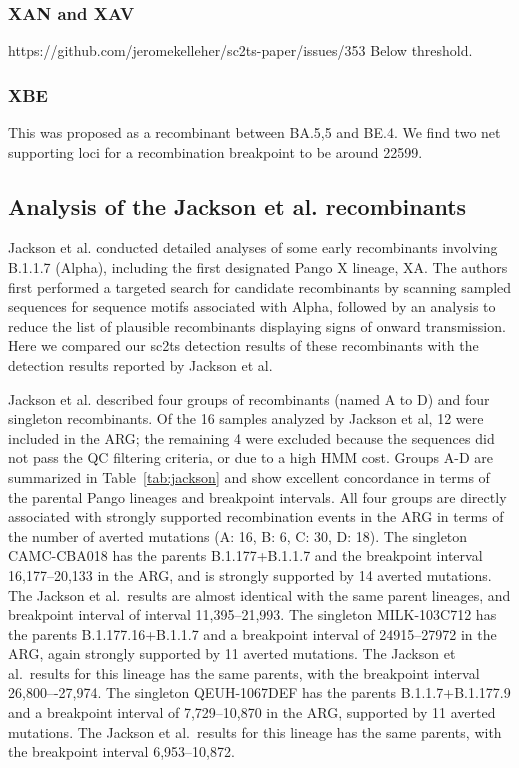 \documentclass[12pt,letterpaper]{article}
\begin{document}
\subsubsection*{XAN and XAV}
https://github.com/jeromekelleher/sc2ts-paper/issues/353
Below threshold.

\subsubsection*{XBE}
This was proposed as a recombinant between BA.5,5 and BE.4.
We find two net supporting loci for a recombination breakpoint to be around 22599.


\subsection*{Analysis of the Jackson et al. recombinants}
Jackson et al.\cite{Jackson2021} conducted detailed analyses of some early recombinants
involving B.1.1.7 (Alpha), including the first designated Pango X lineage, XA.
The authors first performed a targeted search for candidate recombinants by
scanning sampled sequences for sequence motifs associated with Alpha, followed
by an analysis to reduce the list of plausible recombinants displaying signs of
onward transmission. Here we compared our sc2ts detection results of these
recombinants with the detection results reported by Jackson et al.

Jackson et al. described four groups of recombinants (named A to D) and
four singleton recombinants.
Of the 16 samples analyzed by Jackson et al, 12 were included in the ARG;
the remaining 4 were excluded because the sequences did not pass the 
QC filtering criteria, or due to a high HMM cost. Groups A-D are summarized 
in Table~\ref{tab:jackson} and show excellent concordance in terms 
of the parental Pango lineages and breakpoint intervals. All four groups
are directly associated with strongly supported recombination events 
in the ARG in terms of the number of averted mutations 
(A: 16, B: 6, C: 30, D: 18).
The singleton CAMC-CBA018 has 
the parents B.1.177+B.1.1.7 and the breakpoint interval 16,177--20,133 in the ARG, 
and is strongly supported by 14 averted mutations.
The Jackson et al.\ results are almost identical with the same parent lineages, 
and breakpoint interval of interval 11,395–21,993.
The singleton MILK-103C712 has 
the parents B.1.177.16+B.1.1.7 and a breakpoint interval of 24915--27972 
in the ARG, again strongly supported by 11 averted mutations.
The Jackson et al.\ results for this lineage has the same parents,
with the breakpoint interval 26,800–-27,974.
The singleton QEUH-1067DEF has the parents B.1.1.7+B.1.177.9 
and a breakpoint interval of 7,729--10,870 in the ARG, 
supported by 11 averted mutations.
The Jackson et al.\ results for this lineage has the same parents,
with the breakpoint interval 6,953--10,872.
\end{document}

